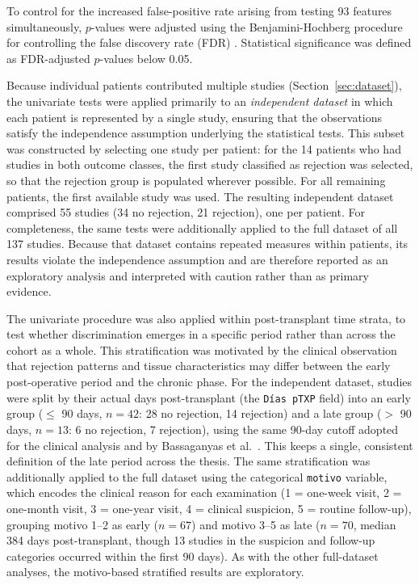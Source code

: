 To control for the increased false-positive rate arising from testing 93 features simultaneously, $p$-values were adjusted using the Benjamini-Hochberg procedure for controlling the false discovery rate (FDR) \cite{benjamini1995}. Statistical significance was defined as FDR-adjusted $p$-values below 0.05.

Because individual patients contributed multiple studies (Section~\ref{sec:dataset}), the univariate tests were applied primarily to an \emph{independent dataset} in which each patient is represented by a single study, ensuring that the observations satisfy the independence assumption underlying the statistical tests. This subset was constructed by selecting one study per patient: for the 14 patients who had studies in both outcome classes, the first study classified as rejection was selected, so that the rejection group is populated wherever possible. For all remaining patients, the first available study was used. The resulting independent dataset comprised 55 studies (34 no rejection, 21 rejection), one per patient. For completeness, the same tests were additionally applied to the full dataset of all 137 studies. Because that dataset contains repeated measures within patients, its results violate the independence assumption and are therefore reported as an exploratory analysis and interpreted with caution rather than as primary evidence.

The univariate procedure was also applied within post-transplant time strata, to test whether discrimination emerges in a specific period rather than across the cohort as a whole. This stratification was motivated by the clinical observation that rejection patterns and tissue characteristics may differ between the early post-operative period and the chronic phase. For the independent dataset, studies were split by their actual days post-transplant (the \texttt{D\'{i}as pTXP} field) into an early group ($\leq$ 90 days, $n = 42$: 28 no rejection, 14 rejection) and a late group ($>$ 90 days, $n = 13$: 6 no rejection, 7 rejection), using the same 90-day cutoff adopted for the clinical analysis and by Bassaganyas et al.\ \cite{bassaganyas2025}. This keeps a single, consistent definition of the late period across the thesis. The same stratification was additionally applied to the full dataset using the categorical \texttt{motivo} variable, which encodes the clinical reason for each examination (1 = one-week visit, 2 = one-month visit, 3 = one-year visit, 4 = clinical suspicion, 5 = routine follow-up), grouping motivo 1--2 as early ($n = 67$) and motivo 3--5 as late ($n = 70$, median 384 days post-transplant, though 13 studies in the suspicion and follow-up categories occurred within the first 90 days). As with the other full-dataset analyses, the motivo-based stratified results are exploratory.

